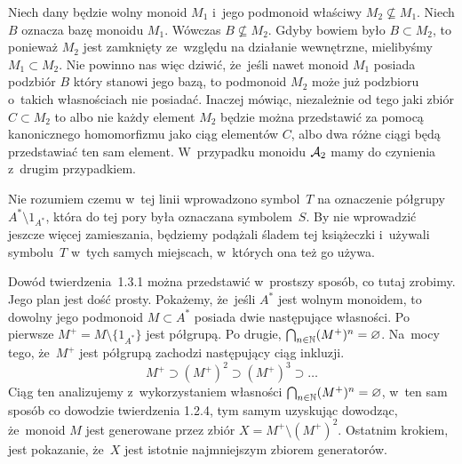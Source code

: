 \documentclass[a4paper,11pt]{article}
\begin{document}
Niech dany będzie wolny monoid $M_{ 1 }$ i~jego podmonoid właściwy
$M_{ 2 } \nsubseteq M_{ 1 }$. Niech $B$ oznacza bazę monoidu
$M_{ 1 }$. Wówczas $B \nsubseteq M_{ 2 }$. Gdyby bowiem było
$B \subset M_{ 2 }$, to ponieważ $M_{ 2 }$ jest zamknięty ze~względu
na działanie wewnętrzne, mielibyśmy $M_{ 1 } \subset M_{ 2 }$. Nie
powinno nas więc dziwić, że~jeśli nawet monoid $M_{ 1 }$ posiada
podzbiór $B$ który stanowi jego bazą, to podmonoid $M_{ 2 }$ może już
podzbioru o~takich własnościach nie posiadać. Inaczej mówiąc,
niezależnie od tego jaki zbiór $C \subset M_{ 2 }$ to albo nie każdy
element $M_{ 2 }$ będzie można przedstawić za pomocą kanonicznego
homomorfizmu jako ciąg elementów $C$, albo dwa różne ciągi będą
przedstawiać ten sam element. W~przypadku monoidu $\mathcal{A}_{ 2 }$ mamy
do czynienia z~drugim przypadkiem.

\vspace{\spaceFour}





 Nie rozumiem czemu w~tej linii wprowadzono
symbol~$T$ na oznaczenie półgrupy $A^{ * } \setminus 1_{ A^{ * } }$,
która do tej pory była oznaczana symbolem~$S$. By nie wprowadzić
jeszcze więcej zamieszania, będziemy podążali śladem tej książeczki
i~używali symbolu~$T$ w~tych samych miejscach, w~których ona też go
używa.

\vspace{\spaceFour}





 Dowód twierdzenia~1.3.1 można przedstawić w~prostszy
sposób, co tutaj zrobimy. Jego plan jest dość prosty. Pokażemy,
że~jeśli $A^{ * }$ jest wolnym monoidem, to dowolny jego podmonoid
$M \subset A^{ * }$ posiada dwie następujące własności. Po pierwsze
$M^{ + } = M \setminus \{ 1_{ A^{ * } } \}$ jest półgrupą. Po drugie,
$\bigcap_{ n \in \mathbb{N} } ( M^{ + } )^{ n } = \varnothing$. Na~mocy tego,
że~$M^{ + }$ jest półgrupą zachodzi następujący ciąg inkluzji.
\begin{equation}
  \label{eq:Forys-Forys-66}
  M^{ + } \supset ( M^{ + } )^{ 2 } \supset ( M^{ + } )^{ 3 } \supset \ldots
\end{equation}
Ciąg ten analizujemy z~wykorzystaniem własności
$\bigcap_{ n \in \mathbb{N} } ( M^{ + } )^{ n } = \varnothing$, w~ten sam
sposób co dowodzie twierdzenia 1.2.4, tym samym uzyskując dowodząc,
że~monoid $M$ jest generowane przez zbiór
$X = M^{ + } \setminus ( M^{ + } )^{ 2 }$. Ostatnim krokiem, jest pokazanie,
że~$X$ jest istotnie najmniejszym zbiorem generatorów.
\end{document}
